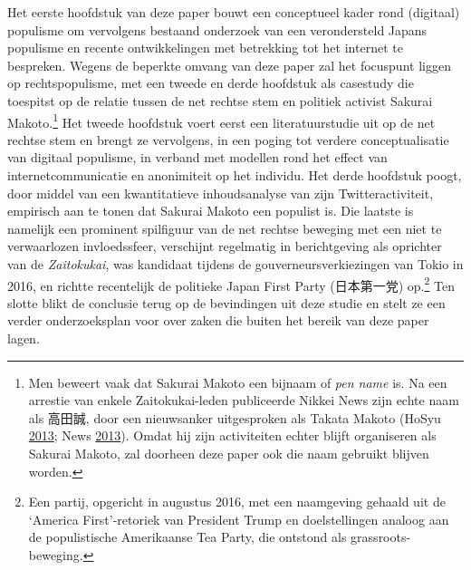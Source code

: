 \documentclass[10.5pt,dutch,]{article}
\begin{document}
Het eerste hoofdstuk van deze paper bouwt een conceptueel kader rond
(digitaal) populisme om vervolgens bestaand onderzoek van een
verondersteld Japans populisme en recente ontwikkelingen met betrekking
tot het internet te bespreken. Wegens de beperkte omvang van deze paper
zal het focuspunt liggen op rechtspopulisme, met een tweede en derde
hoofdstuk als casestudy die toespitst op de relatie tussen de net
rechtse stem en politiek activist Sakurai Makoto.\footnote{Men beweert
  vaak dat Sakurai Makoto een bijnaam of \emph{pen name} is. Na een
  arrestie van enkele Zaitokukai-leden publiceerde Nikkei News zijn
  echte naam als 高田誠, door een nieuwsanker uitgesproken als Takata
  Makoto (HoSyu
  \protect\hyperlink{ref-hosyuux5fzaitokukaiux5f2013}{2013}; News
  \protect\hyperlink{ref-nikkeiux5fnewsux5fdemo-meguriux5f2013}{2013}).
  Omdat hij zijn activiteiten echter blijft organiseren als Sakurai
  Makoto, zal doorheen deze paper ook die naam gebruikt blijven worden.}
Het tweede hoofdstuk voert eerst een literatuurstudie uit op de net
rechtse stem en brengt ze vervolgens, in een poging tot verdere
conceptualisatie van digitaal populisme, in verband met modellen rond
het effect van internetcommunicatie en anonimiteit op het individu. Het
derde hoofdstuk poogt, door middel van een kwantitatieve inhoudsanalyse
van zijn Twitteractiviteit, empirisch aan te tonen dat Sakurai Makoto
een populist is. Die laatste is namelijk een prominent spilfiguur van de
net rechtse beweging met een niet te verwaarlozen invloedssfeer,
verschijnt regelmatig in berichtgeving als oprichter van de
\emph{Zaitokukai}, was kandidaat tijdens de gouverneursverkiezingen van
Tokio in 2016, en richtte recentelijk de politieke Japan First Party
(日本第一党) op.\footnote{Een partij, opgericht in augustus 2016, met
  een naamgeving gehaald uit de `America First'-retoriek van President
  Trump en doelstellingen analoog aan de populistische Amerikaanse Tea
  Party, die ontstond als grassroots-beweging.} Ten slotte blikt de
conclusie terug op de bevindingen uit deze studie en stelt ze een verder
onderzoeksplan voor over zaken die buiten het bereik van deze paper
lagen.
\end{document}
